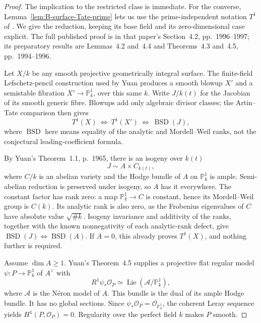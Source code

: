 \begin{proof}
The implication to the restricted class is immediate.  For the
converse, Lemma~\ref{lem:B-surface-Tate-prime} lets us use the
prime-independent notation \(T^1\) of
\citet[Conjecture~1.5 and Theorem~1.6, pp.~1967--1968]{DYuan2021Hodge}.
We give the reduction, keeping its base field and its zero-dimensional
case explicit.  The full published proof is in that paper's
Section~4.2, pp.~1996--1997; its preparatory results are
Lemmas~4.2 and~4.4 and Theorems~4.3 and~4.5,
pp.~1994--1996.

Let \(X/k\) be any smooth projective geometrically integral surface.
The finite-field Lefschetz-pencil construction used by Yuan produces
a smooth blowup \(X'\) and a semistable fibration
\(X'\to\mathbb P^1_k\), over this same \(k\).
Write \(J/k(t)\) for the Jacobian of its smooth generic fibre.
Blowups add only algebraic divisor classes; the Artin--Tate
comparison then gives
\[
                  T^1(X)\ \Longleftrightarrow\ T^1(X')
                         \ \Longleftrightarrow\ \operatorname{BSD}(J),
\]
where \(\operatorname{BSD}\) here means equality of the analytic and
Mordell--Weil ranks, not the conjectural leading-coefficient formula.

By Yuan's Theorem~1.1, p.~1965, there is an isogeny over \(k(t)\)
\[
                         J\sim A\times C_{k(t)},
\]
where \(C/k\) is an abelian variety and the Hodge bundle of \(A\)
on \(\mathbb P^1_k\) is ample.  Semi-abelian reduction is preserved
under isogeny, so \(A\) has it everywhere.  The constant factor has
rank zero: a map \(\mathbb P^1_k\to C\) is constant, hence its
Mordell--Weil group is \(C(k)\).  Its analytic rank is also zero,
as the Frobenius eigenvalues of \(C\) have absolute value
\(\sqrt{\#k}\).  Isogeny invariance and additivity of the ranks,
together with the known nonnegativity of each analytic-rank defect,
give \(\operatorname{BSD}(J)\Longleftrightarrow
\operatorname{BSD}(A)\).  If \(A=0\), this already proves
\(T^1(X)\), and nothing further is required.

Assume \(\dim A\ge1\).  Yuan's Theorem~4.5 supplies a projective flat
regular model \(\psi:P\to\mathbb P^1_k\) of \(A^\vee\) with
\[
                    R^1\psi_*\mathcal O_P
                    \simeq\operatorname{Lie}(\mathcal A/\mathbb P^1_k),
\]
where \(\mathcal A\) is the N\'eron model of \(A\).  This bundle is
the dual of its ample Hodge bundle.  It has no global sections.
Since \(\psi_*\mathcal O_P=\mathcal O_{\mathbb P^1_k}\), the
coherent Leray sequence yields \(H^1(P,\mathcal O_P)=0\).
Regularity over the perfect field \(k\) makes \(P\) smooth.


\end{proof}
